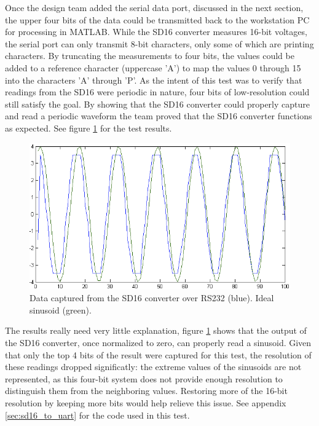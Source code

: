 Once the design team added the serial data port, discussed in the next section, the upper four bits of the data could be transmitted back to the workstation \ac{PC} for processing in MATLAB. While the SD16 converter measures 16-bit voltages, the serial port can only transmit 8-bit characters, only some of which are printing characters. By truncating the measurements to four bits, the values could be added to a reference character (uppercase 'A') to map the values 0 through 15 into the characters 'A' through 'P'. As the intent of this test was to verify that readings from the SD16 were periodic in nature, four bits of low-resolution could still satisfy the goal. By showing that the SD16 converter could properly capture and read a periodic waveform the team proved that the SD16 converter functions as expected. See figure \ref{fig:4bit_current_sense} for the test results.
\begin{figure}[htbp]
\begin{center}
\includegraphics[width=5in]{includes/4bit_current}
\caption{Data captured from the SD16 converter over RS232 (blue). Ideal sinusoid (green).}
\label{fig:4bit_current_sense}
\end{center}
\end{figure}
The results really need very little explanation, figure \ref{fig:4bit_current_sense} shows that the output of the SD16 converter, once normalized to zero, can properly read a sinusoid. Given that only the top 4 bits of the result were captured for this test, the resolution of these readings dropped significatly: the extreme values of the sinusoids are not represented, as this four-bit system does not provide enough resolution to distinguish them from the neighboring values. Restoring more of the 16-bit resolution by keeping more bits would help relieve this issue. See appendix \ref{sec:sd16_to_uart} for the code used in this test.

